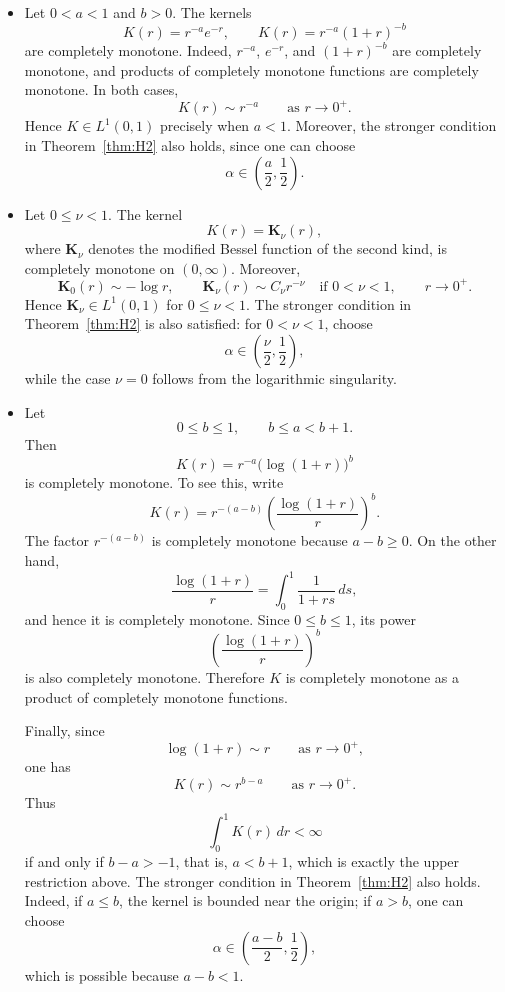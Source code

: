\documentclass[a4paper]{amsart}
\theoremstyle{definition}
\begin{document}
\begin{itemize}
    \item Let \(0<a<1\) and \(b>0\). The kernels
    \[
        K(r)=r^{-a}e^{-r},
        \qquad
        K(r)=r^{-a}(1+r)^{-b}
    \]
    are completely monotone. Indeed, \(r^{-a}\), \(e^{-r}\), and \((1+r)^{-b}\) are completely monotone, and products of completely monotone functions are completely monotone. In both cases,
    \[
        K(r)\sim r^{-a}
        \qquad\text{as }r\to0^+.
    \]
    Hence \(K\in L^1(0,1)\) precisely when \(a<1\). Moreover, the stronger condition in Theorem~\ref{thm:H2} also holds, since one can choose
    \[
        \alpha\in\left(\frac{a}{2},\frac12\right).
    \]

    \item Let \(0\le\nu<1\). The kernel
    \[
        K(r)=\mathbf{K}_{\nu}(r),
    \]
    where \(\mathbf{K}_{\nu}\) denotes the modified Bessel function of the second kind, is completely monotone on \((0,\infty)\). Moreover,
    \[
        \mathbf{K}_{0}(r)\sim -\log r,
        \qquad
        \mathbf{K}_{\nu}(r)\sim C_\nu r^{-\nu}
        \quad\text{if }0<\nu<1,
        \qquad r\to0^+.
    \]
    Hence \(\mathbf{K}_{\nu}\in L^1(0,1)\) for \(0\le\nu<1\). The stronger condition in Theorem~\ref{thm:H2} is also satisfied: for \(0<\nu<1\), choose
    \[
        \alpha\in\left(\frac{\nu}{2},\frac12\right),
    \]
    while the case \(\nu=0\) follows from the logarithmic singularity.

    \item Let
    \[
        0\le b\le1,
        \qquad
        b\le a<b+1.
    \]
    Then
    \[
        K(r)=r^{-a}\bigl(\log(1+r)\bigr)^b
    \]
    is completely monotone. To see this, write
    \[
        K(r)
        =
        r^{-(a-b)}
        \left(\frac{\log(1+r)}{r}\right)^b.
    \]
    The factor \(r^{-(a-b)}\) is completely monotone because \(a-b\ge0\). On the other hand,
    \[
        \frac{\log(1+r)}{r}
        =
        \int_0^1 \frac{1}{1+rs}\,ds,
    \]
    and hence it is completely monotone. Since \(0\le b\le1\), its power
    \[
        \left(\frac{\log(1+r)}{r}\right)^b
    \]
    is also completely monotone. Therefore \(K\) is completely monotone as a product of completely monotone functions.

    Finally, since
    \[
        \log(1+r)\sim r
        \qquad\text{as }r\to0^+,
    \]
    one has
    \[
        K(r)\sim r^{b-a}
        \qquad\text{as }r\to0^+.
    \]
    Thus
    \[
        \int_0^1 K(r)\,dr<\infty
    \]
    if and only if \(b-a>-1\), that is, \(a<b+1\), which is exactly the upper restriction above. The stronger condition in Theorem~\ref{thm:H2} also holds. Indeed, if \(a\le b\), the kernel is bounded near the origin; if \(a>b\), one can choose
    \[
        \alpha\in\left(\frac{a-b}{2},\frac12\right),
    \]
    which is possible because \(a-b<1\).


\end{itemize}
\end{document}
